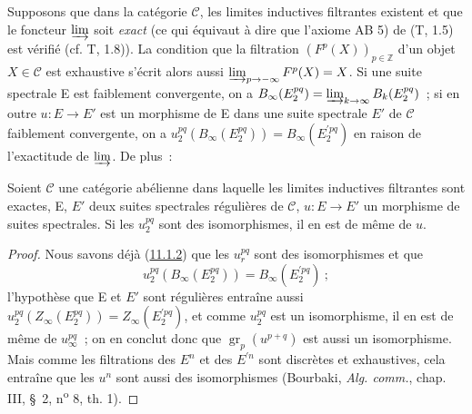 \begin{env}[11.1.4]
\label{0.11.1.4-fr}
Supposons que dans la catégorie $\mathcal C$, les limites inductives filtrantes
existent et que le foncteur $\varinjlim$ soit \emph{exact} (ce qui équivaut à
dire que l'axiome AB 5) de (T, 1.5) est vérifié (cf. T, 1.8)). La condition
que la filtration $(F^p(X))_{p\in\mathbb Z}$ d'un objet $X\in\mathcal C$ est
exhaustive s'écrit alors aussi
$\varinjlim_{p\to-\infty}F^p(X)=X$. Si une suite spectrale E est faiblement
convergente, on a
$B_\infty(E_2^{pq})=\varinjlim_{k\to\infty}B_k(E_2^{pq})$~; si en outre
$u:E\to E'$ est un morphisme de E dans une suite spectrale $E'$ de
$\mathcal C$ faiblement convergente, on a
$u_2^{pq}(B_\infty(E_2^{pq}))=B_\infty(E_2^{\prime pq})$ en raison de
l'exactitude de $\varinjlim$. De plus~:
\end{env}

\begin{proposition}[11.1.5]
\label{0.11.1.5-fr}
Soient $\mathcal C$ une catégorie abélienne dans laquelle les limites
inductives filtrantes sont exactes, E, $E'$ deux suites spectrales régulières
de $\mathcal C$, $u:E\to E'$ un morphisme de suites spectrales. Si les
$u_2^{pq}$ sont des isomorphismes, il en est de même de $u$.
\end{proposition}

\begin{proof}
Nous savons déjà (\hyperref[0.11.1.2-fr]{11.1.2}) que les $u_r^{pq}$ sont des
isomorphismes et que
\[
  u_2^{pq}(B_\infty(E_2^{pq}))=B_\infty(E_2^{\prime pq})~;
\]
l'hypothèse que E et $E'$ sont régulières entraîne aussi
$u_2^{pq}(Z_\infty(E_2^{pq}))=Z_\infty(E_2^{\prime pq})$, et comme
$u_2^{pq}$ est un isomorphisme, il en est de même de $u_\infty^{pq}$~; on en
conclut donc que $\operatorname{gr}_p(u^{p+q})$ est aussi un isomorphisme.
Mais comme les filtrations des $E^n$ et des $E^{\prime n}$ sont discrètes et
exhaustives, cela entraîne que les $u^n$ sont aussi des isomorphismes
(Bourbaki, \emph{Alg. comm.}, chap. III, \S~2, n\textsuperscript{o} 8,
th. 1).
\end{proof}

